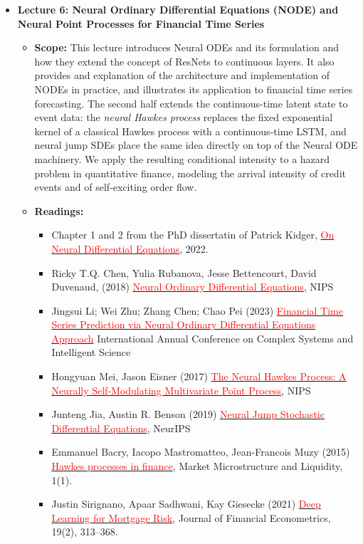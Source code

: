 \documentclass[11pt]{article}
\begin{document}
\begin{itemize}
\item \textbf{Lecture 6: Neural Ordinary Differential Equations (NODE) and Neural Point Processes for Financial Time Series}
  \begin{itemize}
    \item \textbf{Scope:} This lecture introduces Neural ODEs and its formulation and
      how they extend the concept of ResNets to continuous layers. It also provides
      and explanation of the architecture and implementation of NODEs in practice,
      and illustrates its application to financial time series forecasting. The
      second half extends the continuous-time latent state to event data: the
      \textit{neural Hawkes process} replaces the fixed exponential kernel of a
      classical Hawkes process with a continuous-time LSTM, and neural jump SDEs
      place the same idea directly on top of the Neural ODE machinery. We apply the
      resulting conditional intensity to a hazard problem in quantitative finance,
      modeling the arrival intensity of credit events and of self-exciting order flow.
    \item \textbf{Readings:}
      \begin{itemize}
        \item Chapter 1 and 2 from the PhD dissertatin of Patrick Kidger, \href{https://arxiv.org/pdf/2202.02435}{\textcolor{red}{On Neural Differential Equations}}, 2022.
        \item Ricky T.Q. Chen, Yulia Rubanova, Jesse Bettencourt, David Duvenaud, (2018) \href{https://proceedings.neurips.cc/paper_files/paper/2018/file/69386f6bb1dfed68692a24c8686939b9-Paper.pdf}{\textcolor{red}{Neural Ordinary Differential Equations}}, NIPS
        \item Jingsui Li; Wei Zhu; Zhang Chen; Chao Pei (2023) \href{https://ieeexplore.ieee.org/document/10364112/authors\#authors}{\textcolor{red}{Financial Time Series Prediction via Neural Ordinary Differential Equations Approach}} International Annual Conference on Complex Systems and Intelligent Science
        \item Hongyuan Mei, Jason Eisner (2017) \href{https://arxiv.org/pdf/1612.09328}{\textcolor{red}{The Neural Hawkes Process: A Neurally Self-Modulating Multivariate Point Process}}, NIPS
        \item Junteng Jia, Austin R. Benson (2019) \href{https://arxiv.org/pdf/1905.10403}{\textcolor{red}{Neural Jump Stochastic Differential Equations}}, NeurIPS
        \item Emmanuel Bacry, Iacopo Mastromatteo, Jean-Francois Muzy (2015) \href{https://arxiv.org/pdf/1502.04592}{\textcolor{red}{Hawkes processes in finance}}, Market Microstructure and Liquidity, 1(1).
        \item Justin Sirignano, Apaar Sadhwani, Kay Giesecke (2021) \href{https://arxiv.org/pdf/1607.02470}{\textcolor{red}{Deep Learning for Mortgage Risk}}, Journal of Financial Econometrics, 19(2), 313--368.
      \end{itemize}
  \end{itemize}


\end{itemize}
\end{document}
